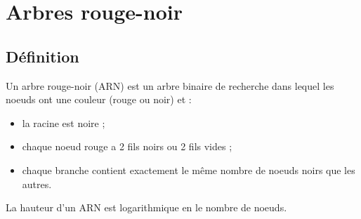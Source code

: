 \documentclass{scrartcl}
\begin{document}
	\section{Arbres rouge-noir}
		\subsection{Définition}
			Un arbre rouge-noir (ARN) est un arbre binaire de recherche dans lequel les noeuds ont une couleur (rouge ou noir) et :
			\begin{itemize}
				\item la racine est noire ;
				\item chaque noeud rouge a 2 fils noirs ou 2 fils vides ;
				\item chaque branche contient exactement le même nombre de noeuds noirs que les autres.
			\end{itemize}

			\rem La hauteur d'un ARN est logarithmique en le nombre de noeuds.
\end{document}
